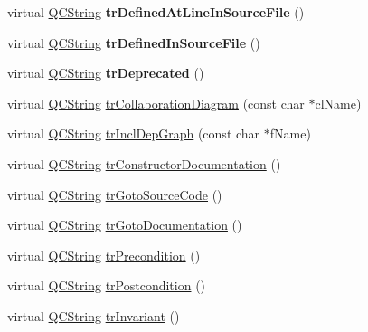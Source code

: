 \begin{DoxyCompactItemize}
\mbox{\label{class_translator_serbian_cyrillic_a5c558340815527239dfc883fd4731fed}} 
virtual \mbox{\hyperlink{class_q_c_string}{Q\+C\+String}} {\bfseries tr\+Defined\+At\+Line\+In\+Source\+File} ()
\item 
\mbox{\label{class_translator_serbian_cyrillic_a756f6eff8bb5841f2723a80a013a2e83}} 
virtual \mbox{\hyperlink{class_q_c_string}{Q\+C\+String}} {\bfseries tr\+Defined\+In\+Source\+File} ()
\item 
\mbox{\label{class_translator_serbian_cyrillic_ae89bbdf8b8e4b9a1e808e2f22152cce9}} 
virtual \mbox{\hyperlink{class_q_c_string}{Q\+C\+String}} {\bfseries tr\+Deprecated} ()
\item 
virtual \mbox{\hyperlink{class_q_c_string}{Q\+C\+String}} \mbox{\hyperlink{class_translator_serbian_cyrillic_a3f0aae98d1b0afd66be7bac0c4175524}{tr\+Collaboration\+Diagram}} (const char $\ast$cl\+Name)
\item 
virtual \mbox{\hyperlink{class_q_c_string}{Q\+C\+String}} \mbox{\hyperlink{class_translator_serbian_cyrillic_a984142e341cc41affb993ee7aab7ffaf}{tr\+Incl\+Dep\+Graph}} (const char $\ast$f\+Name)
\item 
virtual \mbox{\hyperlink{class_q_c_string}{Q\+C\+String}} \mbox{\hyperlink{class_translator_serbian_cyrillic_a54212d40f6ae0d1a703b8c883495fe82}{tr\+Constructor\+Documentation}} ()
\item 
virtual \mbox{\hyperlink{class_q_c_string}{Q\+C\+String}} \mbox{\hyperlink{class_translator_serbian_cyrillic_af8c14c4f370b77b299099f342790f3eb}{tr\+Goto\+Source\+Code}} ()
\item 
virtual \mbox{\hyperlink{class_q_c_string}{Q\+C\+String}} \mbox{\hyperlink{class_translator_serbian_cyrillic_aed7a94e0650e6fdfa375a942c42eb767}{tr\+Goto\+Documentation}} ()
\item 
virtual \mbox{\hyperlink{class_q_c_string}{Q\+C\+String}} \mbox{\hyperlink{class_translator_serbian_cyrillic_a385415b26addbfb64fd9105111b88c6b}{tr\+Precondition}} ()
\item 
virtual \mbox{\hyperlink{class_q_c_string}{Q\+C\+String}} \mbox{\hyperlink{class_translator_serbian_cyrillic_aa7394384163a79b41ce563bcb6808d3d}{tr\+Postcondition}} ()
\item 
virtual \mbox{\hyperlink{class_q_c_string}{Q\+C\+String}} \mbox{\hyperlink{class_translator_serbian_cyrillic_a32467041236c726688770702ecba34fc}{tr\+Invariant}} ()

\end{DoxyCompactItemize}

